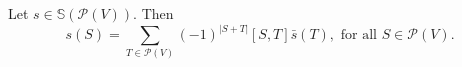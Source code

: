 Let $s \in \mathbb{S}(\mathcal{P}(V))$. Then
$$s(S) = \sum_{T \in \mathcal{P}(V)} (-1)^{|S+T|}[S, T]\bar{s}(T), \text{ for all } S \in \mathcal{P}(V).$$
